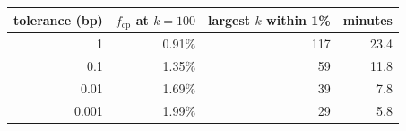\begin{tabular}{|r|r|r|r|}
\hline
\rowcolor{gray!15}tolerance (bp) & $f_{\mathrm{cp}}$ at $k{=}100$ & largest $k$ within 1\% & minutes \\
\hline
1 & 0.91\% & 117 & 23.4 \\
\hline
0.1 & 1.35\% & 59 & 11.8 \\
\hline
0.01 & 1.69\% & 39 & 7.8 \\
\hline
0.001 & 1.99\% & 29 & 5.8 \\
\hline
\end{tabular}
